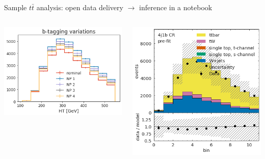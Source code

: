 \documentclass[aspectratio=169]{beamer}
\begin{document}
\begin{frame}{Sample $t\bar{t}$ analysis: open data delivery $\to$ inference in a notebook}
\begin{columns}
\begin{columns}
\includegraphics[width=\linewidth]{PLOTS/gac-ttbar-plot-2.png}

\vfill
\includegraphics[width=\linewidth]{PLOTS/gac-ttbar-plot-5.png}


\end{columns}
\end{columns}
\end{frame}
\end{document}
